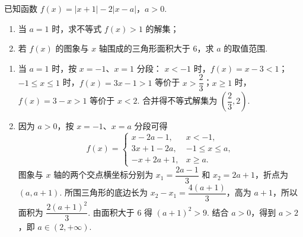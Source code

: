 \begin{problem}
已知函数 \( f(x) = |x + 1| - 2|x - a| \)，\( a > 0 \).

\begin{enumerate}
\item 当 \(a = 1\) 时，求不等式 \(f(x) > 1\) 的解集；
\item 若 \(f(x)\) 的图象与 \(x\) 轴围成的三角形面积大于 \(6\)，求 \(a\) 的取值范围.
\end{enumerate}
\end{problem}

\begin{solution}
\begin{enumerate}
\item 当 \(a=1\) 时，按 \(x=-1\)、\(x=1\) 分段：
\(x<-1\) 时，\(f(x)=x-3<1\)；\(-1\leqslant x\leqslant1\) 时，\(f(x)=3x-1>1\) 等价于 \(x>\dfrac23\)；\(x\geqslant1\) 时，\(f(x)=3-x>1\) 等价于 \(x<2\). 合并得不等式解集为 \(\left(\dfrac23,2\right)\).
\item 因为 \(a>0\)，按 \(x=-1\)、\(x=a\) 分段可得
\[
f(x)=\begin{cases}
x-2a-1,&x<-1,\\
3x+1-2a,&-1\leqslant x\leqslant a,\\
-x+2a+1,&x\geqslant a.
\end{cases}
\]
图象与 \(x\) 轴的两个交点横坐标分别为 \(x_1=\dfrac{2a-1}{3}\) 和 \(x_2=2a+1\)，折点为 \((a,a+1)\). 所围三角形的底边长为
\(x_2-x_1=\dfrac{4(a+1)}{3}\)，高为 \(a+1\)，所以面积为 \(\dfrac{2(a+1)^2}{3}\). 由面积大于 \(6\) 得 \((a+1)^2>9\). 结合 \(a>0\)，得到 \(a>2\)，即 \(a\in(2,+\infty)\).
\end{enumerate}
\end{solution}
